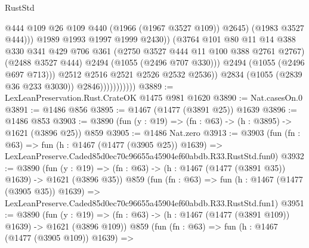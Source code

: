 \begin{lexlean}{RustStd}
\begin{coremodule}
                                          @444
                                          @109
                                          @26
                                          @109
                                          @440
                                          (@1966 (@1967 @3527 @109))
                                          @2645)
                                        (@1983 @3527 @444)))
                                    @1989
                                    @1993
                                    @1997
                                    @1999
                                    @2430))
                                (@3764
                                  @101
                                  @80
                                  @11
                                  @14
                                  @388
                                  @330
                                  @341
                                  @429
                                  @706
                                  @361
                                  (@2750 @3527 @444 @11 @100 @388 @2761 @2767)
                                  (@2488 @3527 @444)
                                  @2494
                                  (@1055 (@2496 @707 @330)))
                                @2494
                                (@1055 (@2496 @697 @713)))
                              @2512
                              @2516
                              @2521
                              @2526
                              @2532
                              @2536))
                          @2834
                          (@1055 (@2839 @36 @233 @3030))
                          @2846)))))))))))
@3889 := LexLeanPreservation.Rust.CrateOK @1475 @981 @1620
@3890 := Nat.casesOn.{0}
@3891 := @1486 @856
@3895 := @1467 (@1477 (@3891 @25)) @1639
@3896 := @1486 @853
@3903 := @3890 (fun (y : @19) => (fn : @63) -> (h : @3895) -> @1621 (@3896 @25)) @859
@3905 := @1486 Nat.zero
@3913 := @3903
    (fun (fn : @63) =>
    fun (h : @1467 (@1477 (@3905 @25)) @1639) =>
    LexLeanPreserve.Caded85d0ec70c96655a45904ef60abdb.R33.RustStd.fun0)
@3932 := @3890
    (fun (y : @19) => (fn : @63) -> (h : @1467 (@1477 (@3891 @35)) @1639) -> @1621 (@3896 @35))
    @859
    (fun (fn : @63) =>
    fun (h : @1467 (@1477 (@3905 @35)) @1639) =>
    LexLeanPreserve.Caded85d0ec70c96655a45904ef60abdb.R33.RustStd.fun1)
@3951 := @3890
    (fun (y : @19) => (fn : @63) -> (h : @1467 (@1477 (@3891 @109)) @1639) -> @1621 (@3896 @109))
    @859
    (fun (fn : @63) =>
    fun (h : @1467 (@1477 (@3905 @109)) @1639) =>

\end{coremodule}
\end{lexlean}
